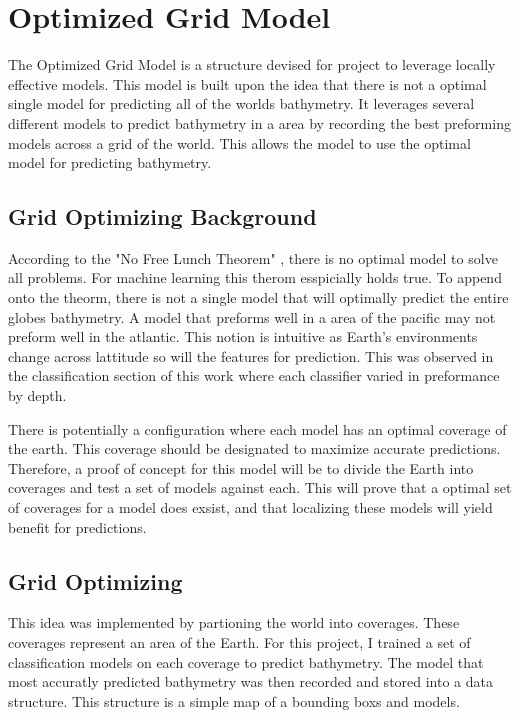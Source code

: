 \section{Optimized Grid Model}
\setlength{\parindent}{10ex}
The Optimized Grid Model is a structure devised for project to leverage locally effective models.
This model is built upon the idea that there is not a optimal single model for predicting all of the worlds bathymetry.
It leverages several different models to predict bathymetry in a area by recording the best preforming models across a grid of the world.
This allows the model to use the optimal model for predicting bathymetry.

\subsection{Grid Optimizing Background}
According to the "No Free Lunch Theorem" \cite{wolpert1997no}, there is no optimal model to solve all problems.
For machine learning this therom esspicially holds true.
To append onto the theorm, there is not a single model that will optimally predict the entire globes bathymetry.
A model that preforms well in a area of the pacific may not preform well in the atlantic.
This notion is intuitive as Earth's environments change across lattitude so will the features for prediction.
This was observed in the classification section of this work where each classifier varied in preformance by depth.

\par
There is potentially a configuration where each model has an optimal coverage of the earth.
This coverage should be designated to maximize accurate predictions.
Therefore, a proof of concept for this model will be to divide the Earth into coverages and test a set of models against each.
This will prove that a optimal set of coverages for a model does exsist, and that localizing these models will yield benefit for predictions.

\subsection{Grid Optimizing}
This idea was implemented by partioning the world into coverages.
These coverages represent an area of the Earth.
For this project, I trained a set of classification models on each coverage to predict bathymetry.
The model that most accuratly predicted bathymetry was then recorded and stored into a data structure.
This structure is a simple map of a bounding boxs and models.

